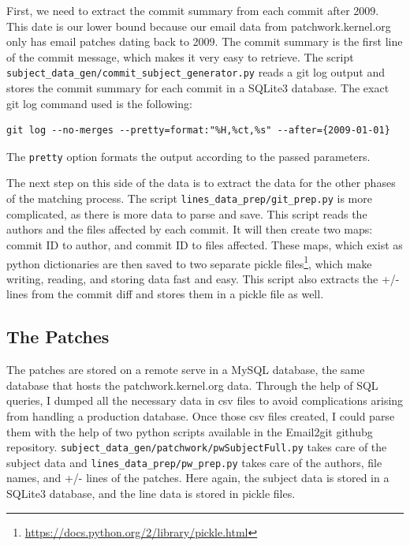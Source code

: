 First, we need to extract the commit summary from each commit after 2009. This date is our lower bound because our email data from patchwork.kernel.org only has email patches dating back to 2009. The commit summary is the first line of the commit message, which makes it very easy to retrieve. The script \texttt{subject\_data\_gen/commit\_subject\_generator.py} reads a git log output and stores the commit summary for each commit in a SQLite3 database. The exact git log command used is the following:
\begin{lstlisting}
git log --no-merges --pretty=format:"%H,%ct,%s" --after={2009-01-01}
\end{lstlisting}
The \texttt{pretty} option formats the output according to the passed parameters. 

The next step on this side of the data is to extract the data for the other phases of the matching process. The script \texttt{lines\_data\_prep/git\_prep.py} is more complicated, as there is more data to parse and save. This script reads the authors and the files affected by each commit. It will then create two maps: commit ID to author, and commit ID to files affected. These maps, which exist as python dictionaries are then saved to two separate pickle files\footnote{\url{https://docs.python.org/2/library/pickle.html}}, which make writing, reading, and storing data fast and easy. This script also extracts the +/- lines from the commit diff and stores them in a pickle file as well. 



\subsection{The Patches}

The patches are stored on a remote serve in a MySQL database, the same database that hosts the patchwork.kernel.org data. Through the help of SQL queries, I dumped all the necessary data in csv files to avoid complications arising from handling a production database. Once those csv files created, I could parse them with the help of two python scripts available in the Email2git githubg repository. \texttt{subject\_data\_gen/patchwork/pwSubjectFull.py} takes care of the subject data and \texttt{lines\_data\_prep/pw\_prep.py} takes care of the authors, file names, and +/- lines of the patches. Here again, the subject data is stored in a SQLite3 database, and the line data is stored in pickle files. 







